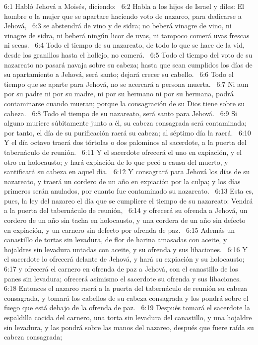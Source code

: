 6:1 Habló Jehová a Moisés, diciendo:  
6:2 Habla a los hijos de Israel y diles: El hombre o la mujer que se apartare haciendo voto de nazareo, para dedicarse a Jehová,  
6:3 se abstendrá de vino y de sidra; no beberá vinagre de vino, ni vinagre de sidra, ni beberá ningún licor de uvas, ni tampoco comerá uvas frescas ni secas.  
6:4 Todo el tiempo de su nazareato, de todo lo que se hace de la vid, desde los granillos hasta el hollejo, no comerá.  
6:5 Todo el tiempo del voto de su nazareato no pasará navaja sobre su cabeza; hasta que sean cumplidos los días de su apartamiento a Jehová, será santo; dejará crecer su cabello.  
6:6 Todo el tiempo que se aparte para Jehová, no se acercará a persona muerta.  
6:7 Ni aun por su padre ni por su madre, ni por su hermano ni por su hermana, podrá contaminarse cuando mueran; porque la consagración de su Dios tiene sobre su cabeza.  
6:8 Todo el tiempo de su nazareato, será santo para Jehová.  
6:9 Si alguno muriere súbitamente junto a él, su cabeza consagrada será contaminada; por tanto, el día de su purificación raerá su cabeza; al séptimo día la raerá.  
6:10 Y el día octavo traerá dos tórtolas o dos palominos al sacerdote, a la puerta del tabernáculo de reunión.  
6:11 Y el sacerdote ofrecerá el uno en expiación, y el otro en holocausto; y hará expiación de lo que pecó a causa del muerto, y santificará su cabeza en aquel día.  
6:12 Y consagrará para Jehová los días de su nazareato, y traerá un cordero de un año en expiación por la culpa; y los días primeros serán anulados, por cuanto fue contaminado su nazareato.  
6:13 Esta es, pues, la ley del nazareo el día que se cumpliere el tiempo de su nazareato: Vendrá a la puerta del tabernáculo de reunión,  
6:14 y ofrecerá su ofrenda a Jehová, un cordero de un año sin tacha en holocausto, y una cordera de un año sin defecto en expiación, y un carnero sin defecto por ofrenda de paz.  
6:15 Además un canastillo de tortas sin levadura, de flor de harina amasadas con aceite, y hojaldres sin levadura untadas con aceite, y su ofrenda y sus libaciones.  
6:16 Y el sacerdote lo ofrecerá delante de Jehová, y hará su expiación y su holocausto;  
6:17 y ofrecerá el carnero en ofrenda de paz a Jehová, con el canastillo de los panes sin levadura; ofrecerá asimismo el sacerdote su ofrenda y sus libaciones.  
6:18 Entonces el nazareo raerá a la puerta del tabernáculo de reunión su cabeza consagrada, y tomará los cabellos de su cabeza consagrada y los pondrá sobre el fuego que está debajo de la ofrenda de paz.  
6:19 Después tomará el sacerdote la espaldilla cocida del carnero, una torta sin levadura del canastillo, y una hojaldre sin levadura, y las pondrá sobre las manos del nazareo, después que fuere raída su cabeza consagrada;  

